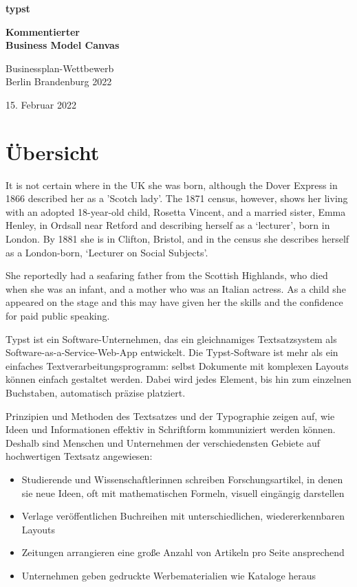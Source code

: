 \documentclass[11pt, a4paper]{article}
\newcommand{\gender}{\raisebox{-.25em}{*}}
\let\oldsection\section
\renewcommand\section{\clearpage\oldsection}
\begin{document}
\raggedright
\pagecolor{eastern}
\mbox{}
\vfill
{
\color{white}
\LARGE
\textbf{\fontsize{50}{60}\selectfont typst}
\vspace{1cm}

\textbf{Kommentierter \\ Business Model Canvas}

{
\Large
Businessplan-Wettbewerb \\
Berlin Brandenburg 2022 

15. Februar 2022
}
\vspace{2.25cm}
}
\section*{Übersicht}
\NoBgThispage
\vspace{2mm}

It is not certain where in the UK she was born, although the Dover Express
in 1866 described her as a 'Scotch lady'. The 1871 census, however, shows
her living with an adopted 18-year-old child, Rosetta Vincent, and a married
sister, Emma Henley, in Ordsall near Retford and describing herself as a ‘lecturer’,
born in London. By 1881 she is in Clifton, Bristol, and in the census she
describes herself as a London-born, ‘Lecturer on Social Subjects’.

She reportedly had a seafaring father from the Scottish Highlands,
who died when she was an infant, and a mother who was an Italian actress.
As a child she appeared on the stage and this may have given her the skills
and the confidence for paid public speaking.

Typst ist ein Software-Unternehmen, das ein gleichnamiges Textsatzsystem als Software-as-a-Service-Web-App entwickelt. Die Typst-Software ist mehr als ein einfaches Textverarbeitungsprogramm: selbst Dokumente mit komplexen Layouts können einfach gestaltet werden. Dabei wird jedes Element, bis hin zum einzelnen Buchstaben, automatisch präzise platziert.

Prinzipien und Methoden des Textsatzes und der Typographie zeigen auf, wie Ideen und Informationen effektiv in Schriftform kommuniziert werden können. Deshalb sind Menschen und Unternehmen der verschiedensten Gebiete auf hochwertigen Textsatz angewiesen:
\begin{itemize}
    \item Studierende und Wissenschaftler\gender{}innen schreiben Forschungsartikel, in denen sie neue Ideen, oft mit mathematischen Formeln, visuell eingängig darstellen
    \item Verlage veröffentlichen Buchreihen mit unterschiedlichen, wiedererkennbaren Layouts
    \item Zeitungen arrangieren eine große Anzahl von Artikeln pro Seite ansprechend
    \item Unternehmen geben gedruckte Werbematerialien wie Kataloge heraus
\end{itemize}
\end{document}
